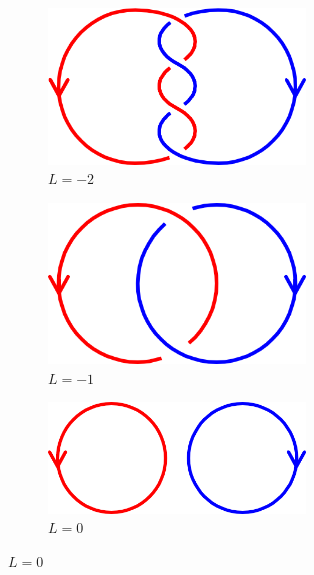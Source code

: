     \begin{figure}[!ht]
        \centering
        \begin{subfigure}{0.1868\textwidth}
            \centering
            \includegraphics[width = 0.75\textwidth]{2 - fluid component/1 - structures/2 - global/images/-2.png}
            \caption{$L = -2$}
        \end{subfigure}%
        \begin{subfigure}{0.1811\textwidth}
            \centering
            \includegraphics[width = 0.75\textwidth]{2 - fluid component/1 - structures/2 - global/images/-1.png}
            \caption{$L = -1$}
        \end{subfigure}%
        \begin{subfigure}{0.2634\textwidth}
            \centering
            \includegraphics[width = 0.75\textwidth]{2 - fluid component/1 - structures/2 - global/images/0.png}
            \caption{$L = 0$}

\end{subfigure}
\end{figure}
